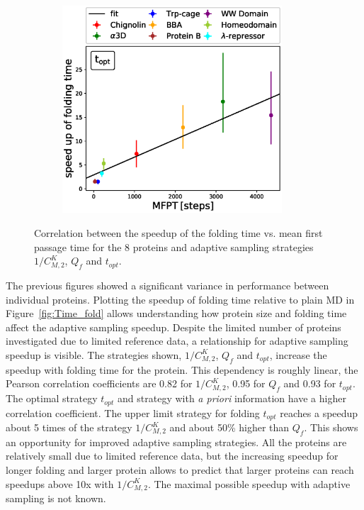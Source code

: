 \begin{figure}[H]
\begin{subfigure}[t]{0.5\textwidth}
    \includegraphics[width=0.9\textwidth]{figures/compare_MD_speed_up_t_opt_6_steps10000_52_0.eps}
  \end{subfigure}
  \caption{Correlation between the speedup of the folding time vs. mean first passage time for the 8 proteins and adaptive sampling strategies $1/C_{M,2}^K$, $Q_f$ and $t_{opt}$.}
  \label{fig:compare-MD-speed-cmacro}
\end{figure}

The previous figures showed a significant variance in performance between individual proteins. Plotting the speedup of folding time relative to plain MD in Figure~\ref{fig:Time_fold} allows understanding how protein size and folding time affect the adaptive sampling speedup. Despite the limited number of proteins investigated due to limited reference data, a relationship for adaptive sampling speedup is visible. The strategies shown, $1/C_{M,2}^K$, $Q_f$ and $t_{opt}$, increase the speedup with folding time for the protein. This dependency is roughly linear, the Pearson correlation coefficients are 0.82 for $1/C_{M,2}^K$, 0.95 for $Q_f$ and 0.93 for $t_{opt}$. The optimal strategy $t_{opt}$ and strategy with \emph{a priori} information have a higher correlation coefficient. The upper limit strategy for folding $t_{opt}$ reaches a speedup about 5 times of the strategy $1/C_{M,2}^K$ and about 50\% higher than $Q_f$. This shows an opportunity for improved adaptive sampling strategies. All the proteins are relatively small due to limited reference data, but the increasing speedup for longer folding and larger protein allows to predict that larger proteins can reach speedups above 10x with $1/C_{M,2}^K$. The maximal possible speedup with adaptive sampling is not known. 

